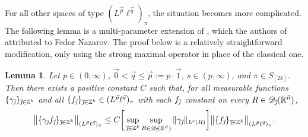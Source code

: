 \documentclass[11pt, reqno]{amsart}
\newtheorem{lemma}[theorem]{Lemma}
\theoremstyle{definition}
\theoremstyle{remark}
\numberwithin{equation}{section}
\newcommand{\D}{\mathscr D}
\newcommand{\R}{\mathbb R}
\newcommand{\Z}{\mathbb Z}
\newcommand{\vnull}{\vec 0}
\newcommand{\vone}{\vec 1}
\newcommand{\vj}{\vec{\textit{\j}}}
\newcommand{\vn}{\vec n}
\newcommand{\vp}{\vec p}
\newcommand{\vq}{\vec q}
\newcommand{\aveL}{\textit{\L}}
\newcommand{\Norm}[2]{\|#1\|_{#2}}
\newcommand{\bNorm}[2]{\big\|#1\big\|_{#2}}
\begin{document}
For all other spaces of type $(L^{\vp}\ell^{\vq})_\pi$,
the situation becomes more complicated.
The following lemma is a multi-parameter extension of
\cite[Theorem 3.7(i)]{FR21}, which the authors of \cite{FR21}
attributed to Fedor Nazarov. The proof below
is a relatively straightforward modification,
only using the strong maximal operator in place of the classical one.

\begin{lemma}\label{carl small q}
Let $p\in(0,\infty)$, $\vnull<\vq\leq\vp:=p\cdot\vone$,
$s\in(p,\infty)$, and $\pi\in S_{[2k]}$.
Then there exists a positive constant $C$ such that,
for all measurable functions $\{\gamma_{\vj}\}_{\vj\in\mathbb Z^k}$ and
all $\{ f_{\vj}\}_{\vj\in\mathbb Z^k}\in(L^{\vp}\ell^{\vq})_\pi$
with each $f_{\vj}$ constant on every $R\in\D_{\vj}(\R^{\vn})$,
\begin{equation*}
\bNorm{\{\gamma_{\vj}f_{\vj}\}_{\vj\in\mathbb Z^k}}{(L^{\vp}\ell^{\vq})_\pi}
\le C\bigg[\sup_{\vj\in\Z^k}\sup_{R\in\D_{\vj}(\R^{\vn})}
\Norm{\gamma_{\vj}}{\aveL^s(R)}\bigg]\bNorm{\{ f_{\vj}\}_{\vj\in\mathbb Z^k}}{(L^{\vp}\ell^{\vq})_\pi}.
\end{equation*}
\end{lemma}
\end{document}
